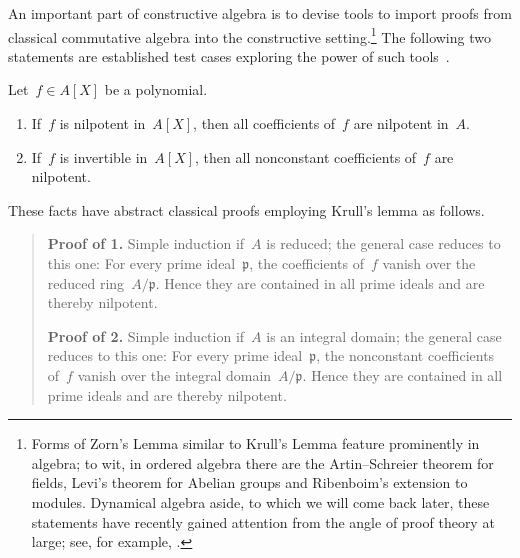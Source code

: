 \documentclass[envcountsect,envcountsame,runningheads]{llncs}
\newcommand{\ppp}{\mathfrak{p}}
\renewcommand{\_}{\mathpunct{.}\,}
\begin{document}
An important part of constructive algebra is to devise tools to import
proofs from classical commutative algebra into the constructive
setting.\footnote{Forms of Zorn's Lemma similar to Krull's Lemma
feature prominently in algebra; to wit, in ordered algebra there are the
Artin--Schreier theorem for fields, Levi's theorem for Abelian groups and
Ribenboim's extension to modules. Dynamical algebra aside, to which we will
come back later, these statements have recently gained attention from the angle
of proof theory at large; see, for example,
\cite{rin:ukl,rin:edde,rin:edde:full,wessel:ordering,schuster-wessel:ext,wessel:conred,bon:rib,pow:occ}.}
The following two statements are established test cases exploring the power of
such tools~\cite{schuster:induction,schuster:inductionjournal,persson:constructive-spectrum,powell-schuster-wiesnet:krull,swy:dynprime,schuster-wessel:indeterminacy,banaschweski-vermeulen:radical,richman:trivial-rings,coquand-lombardi:logical,coquand-lombardi-roy:dynamicalmethod}.

\begin{proposition}\label{prop:test-cases}Let~$f \in A[X]$ be a polynomial.
\begin{enumerate}
\item If~$f$ is nilpotent in~$A[X]$, then all coefficients of~$f$ are nilpotent in~$A$.
\item If~$f$ is invertible in~$A[X]$, then all nonconstant coefficients of~$f$ are nilpotent.
\end{enumerate}
\end{proposition}

These facts have abstract classical proofs employing Krull's lemma as follows.

\begin{quote}\small
  \textbf{Proof of 1.} Simple induction if~$A$ is
  reduced; the general case reduces to this one: For every prime ideal~$\ppp$,
  the coefficients of~$f$ vanish over the reduced ring~$A/\ppp$. Hence they are
  contained in all prime ideals and are thereby
  nilpotent.\medskip

  \textbf{Proof of 2.} Simple induction if~$A$ is an
  integral domain; the general case reduces to this one: For every prime
  ideal~$\ppp$, the nonconstant coefficients of~$f$ vanish over the integral
  domain~$A/\ppp$. Hence they are contained in all prime ideals
  and are thereby nilpotent.
\end{quote}
\end{document}
